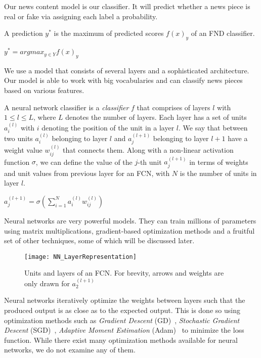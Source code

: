 Our news content model is our classifier. It will predict whether a news piece is real or fake via assigning each label a probability.
\begin{definition}
    A prediction $y^*$ is the maximum of predicted scores $f(x)_y$ of an FND classifier.
    \begin{center}
        $y^* = argmax_{y \in Y} f(x)_y$
    \end{center}
\end{definition}
We use a model that consists of several layers and a sophisticated architecture. Our model is able to work with big vocabularies and can classify news pieces based on various features.
\begin{definition}
    A neural network classifier is a \emph{classifier} $f$ that comprises of layers $l$ with $1 \leq l \leq L$, where $L$ denotes the number of layers. Each layer has a set of units $a_i^{(l)}$ with $i$ denoting the position of the unit in
    a layer $l$. We say that between two units $a_i^{(l)}$ belonging to layer $l$ and $a_j^{(l+1)}$ belonging to layer
    $l+1$ have a weight value $w_{ij}^{(l)}$ that connects them. Along with a non-linear activation function $\sigma$, we
    can define the value of the $j$-th unit $a_j^{(l+1)}$ in terms of weights and unit values from previous layer for an FCN, with $N$ is the number of units in layer $l$.
    \begin{center}
        $a_j^{(l+1)} = \sigma(\sum_{i=1}^{N} a_i^{(l)} w_{ij}^{(l)})$
    \end{center}
\end{definition}
Neural networks are very powerful models. They can train millions of parameters using matrix multiplications, gradient-based optimization methods and a fruitful set of other techniques, some of which will be discussed later.
\begin{figure}
    \centering
    \texttt{[image: NN\_LayerRepresentation]}
    \caption[Units and layers of an FCN]{Units and layers of an FCN. For brevity, arrows and weights are only drawn for $a_2^{(l+1)}$}
    \label{fig:NN_LayerRepresentation}
\end{figure}
Neural networks iteratively optimize the weights between layers such that the produced output is as close as to the
expected output. This is done so using optimization methods such as \emph{Gradient Descent} (GD)~\parencite{GD_Cauchy},
\emph{Stochastic Gradient Descent} (SGD)~\parencite{SGD_Robbins}, \emph{Adaptive Moment Estimation} (Adam)~\parencite{Adam_Kingma} to minimize the loss function. While there exist many optimization methods available for neural networks, we do not examine any of them.\\
